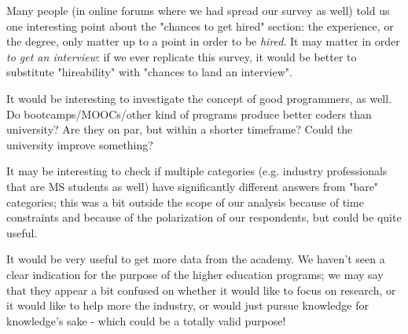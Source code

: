 \documentclass{sigchi}
\begin{document}
Many people (in online forums where we had spread our survey as well) told us one interesting point about the "chances to get hired" section: the experience, or the degree, only matter up to a point in order to be \textit{hired}. It may matter in order \textit{to get an interview}: if we ever replicate this survey, it would be better to substitute "hireability" with "chances to land an interview".

It would be interesting to investigate the concept of good programmers, as well. Do bootcamps/MOOCs/other kind of programs produce better coders than university? Are they on par, but within a shorter timeframe? Could the university improve something?

It may be interesting to check if multiple categories (e.g. industry professionals that are MS students as well) have significantly different answers from "bare" categories; this was a bit outside the scope of our analysis because of time constraints and because of the polarization of our respondents, but could be quite useful.

It would be very useful to get more data from the academy. We haven't seen a clear indication for the purpose of the higher education programs; we may say that they appear a bit confused on whether it would like to focus on research, or it would like to help more the industry, or would just pursue knowledge for knowledge's sake - which could be a totally valid purpose!

\balance{}

\balance{}



\end{document}
